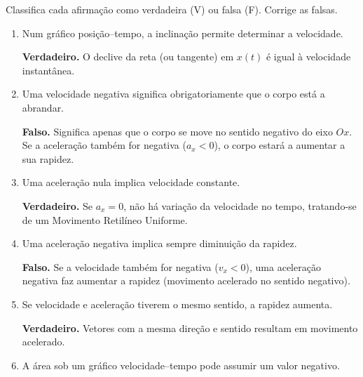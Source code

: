 \documentclass[11pt,a4paper]{article}
\begin{document}
	Classifica cada afirmação como verdadeira (V) ou falsa (F).
	Corrige as falsas.
	
	\begin{enumerate}[label=\textbf{\arabic*.},resume]
		
		\item[\textbf{[V]}]
		Num gráfico posição--tempo, a inclinação permite determinar a velocidade.
		
		\begin{solucao}
			\textbf{Verdadeiro.} O declive da reta (ou tangente) em $x(t)$ é igual à velocidade instantânea.
		\end{solucao}
		
		\item[\textbf{[F]}]
		Uma velocidade negativa significa obrigatoriamente que o corpo está a
		abrandar.
		
		\begin{solucao}
			\textbf{Falso.} Significa apenas que o corpo se move no sentido negativo do eixo $Ox$. Se a aceleração também for negativa ($a_x < 0$), o corpo estará a aumentar a sua rapidez.
		\end{solucao}
		
		\item[\textbf{[V]}]
		Uma aceleração nula implica velocidade constante.
		
		\begin{solucao}
			\textbf{Verdadeiro.} Se $a_x = 0$, não há variação da velocidade no tempo, tratando-se de um Movimento Retilíneo Uniforme.
		\end{solucao}
		
		\item[\textbf{[F]}]
		Uma aceleração negativa implica sempre diminuição da rapidez.
		
		\begin{solucao}
			\textbf{Falso.} Se a velocidade também for negativa ($v_x < 0$), uma aceleração negativa faz aumentar a rapidez (movimento acelerado no sentido negativo).
		\end{solucao}
		
		\item[\textbf{[V]}]
		Se velocidade e aceleração tiverem o mesmo sentido, a rapidez aumenta.
		
		\begin{solucao}
			\textbf{Verdadeiro.} Vetores com a mesma direção e sentido resultam em movimento acelerado.
		\end{solucao}
		
		\item[\textbf{[V]}]
		A área sob um gráfico velocidade--tempo pode assumir um valor negativo.
		

\end{enumerate}
\end{document}
